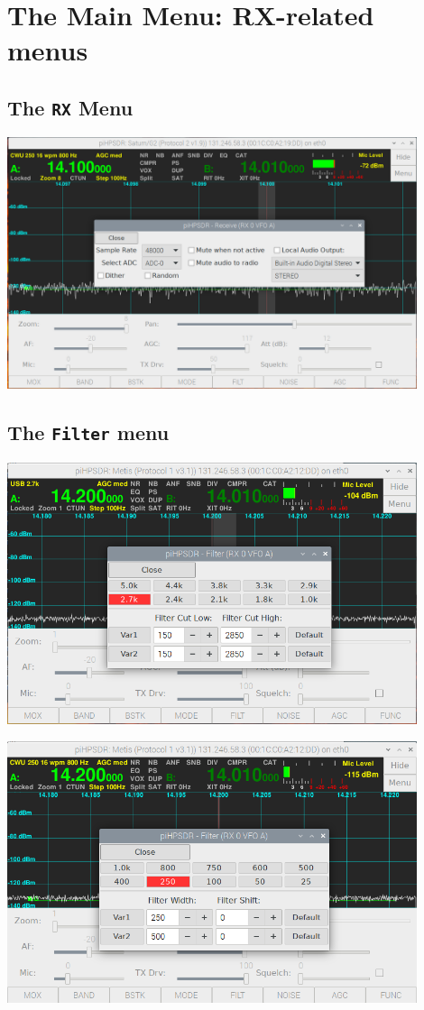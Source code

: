 \documentclass[12pt]{book}
\begin{document}
\chapter{The Main Menu: RX-related menus}

\section{The \texttt{RX} Menu}
\begin{center}
\includegraphics[width=12cm]{RXMenu.png}
\end{center}

\section{The \texttt{Filter} menu}
\begin{center}
\includegraphics[width=12cm]{FilterMenuUSB.png}
\end{center}
\begin{center}
\includegraphics[width=12cm]{FilterMenuCW.png}
\end{center}
\end{document}
